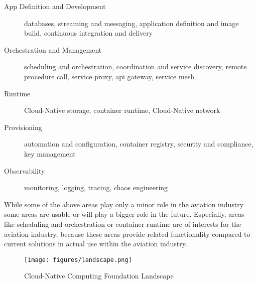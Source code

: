 \documentclass[titlepage]{report}
\begin{document}
\begin{description}
    \item[App Definition and Development] databases, streaming and messaging, application definition and image build, continuous integration and delivery
    \item[Orchestration and Management] scheduling and orchestration, coordination and service discovery, remote procedure call, service proxy, api gateway, service mesh
    \item[Runtime] Cloud-Native storage, container runtime, Cloud-Native network
    \item[Provisioning] automation and configuration, container registry, security and compliance, key management
    \item[Observability] monitoring, logging, tracing, chaos engineering
\end{description}

While some of the above areas play only a minor role in the aviation industry some areas are usable or will play a bigger role in the future.
Especially, areas like scheduling and orchestration or container runtime are of interests for the aviation industry, because
these areas provide related functionality compared to current solutions in actual use within the aviation industry.

\begin{figure}[H]
    \centering
    \texttt{[image: figures/landscape.png]}
    \caption{Cloud-Native Computing Foundation Landscape}\label{fig:landscape}
\end{figure}
 
\end{document}
